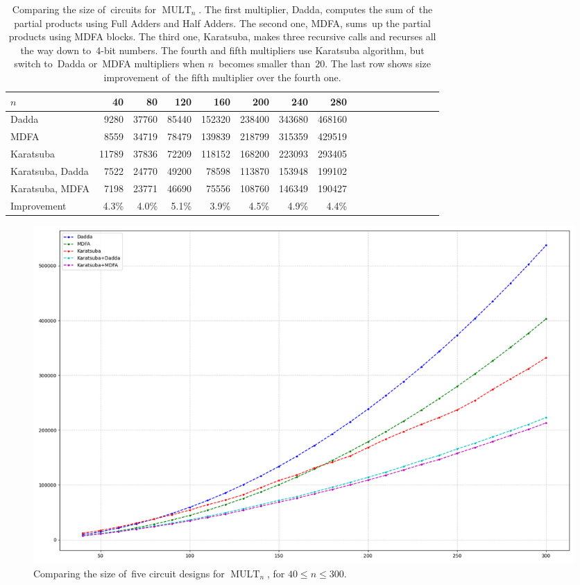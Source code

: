 \documentclass[a4paper, UKenglish, cleveref, autoref,  thm-restate]{lipics-v2021}
\DeclareMathOperator{\MULT}{MULT}
\begin{document}
    \begin{table}[ht]
        \caption{Comparing the size of~circuits for $\MULT_n$. The first multiplier, Dadda, computes the sum of~the partial products using Full Adders and Half Adders. The second one, MDFA, sums~up the partial products using MDFA blocks.
        The third one, Karatsuba, makes three recursive calls and recurses all the way down to~4-bit numbers. The fourth and fifth multipliers use Karatsuba algorithm, but switch to~Dadda or~MDFA multipliers when $n$~becomes smaller than~$20$. The last row shows size improvement of~the fifth multiplier over the fourth one.}
        \label{table:multiplication}
        \begin{center}
            \begin{tabular}{lrrrrrrrrrrrrrrrr}
                \toprule
                $n$ & 40 & 80 & 120 & 160 & 200 & 240 & 280 \\
                \midrule
                Dadda & 9280 & 37760 & 85440 & 152320 & 238400 & 343680 & 468160 \\
                MDFA & 8559 & 34719 & 78479 & 139839 & 218799 & 315359 & 429519 \\
                Karatsuba & 11789 & 37836 & 72209 & 118152 & 168200 & 223093 & 293405 \\
                Karatsuba, Dadda& 7522 & 24770 & 49200 & 78598 & 113870 & 153948 & 199102 \\
                Karatsuba, MDFA& 7198 & 23771 & 46690 & 75556 & 108760 & 146349 & 190427 \\
                Improvement  & 4.3\%  & 4.0\%  & 5.1\%  & 3.9\%  & 4.5\%  & 4.9\%  & 4.4\% \\
                \bottomrule
            \end{tabular}
        \end{center}
    \end{table}

    \begin{figure}[ht]
        \includegraphics[width=\linewidth]{images/plot40_300_10}
        \caption{Comparing the size of~five circuit designs for $\MULT_n$, for $40 \le n \le 300$.}
        \label{figure:multiplication}
    \end{figure}
\end{document}
